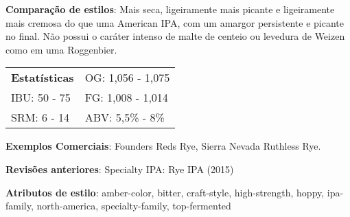 \textbf{Comparação de estilos}: Mais seca, ligeiramente mais picante e ligeiramente mais cremosa do que uma American IPA, com um amargor persistente e picante no final. Não possui o caráter intenso de malte de centeio ou levedura de Weizen como em uma Roggenbier.

\begin{tabular}{@{}p{35mm}p{35mm}@{}}
  \textbf{Estatísticas} & OG: 1,056 - 1,075 \\
  IBU: 50 - 75  & FG: 1,008 - 1,014 \\
  SRM: 6 - 14  & ABV: 5,5\% - 8\%
\end{tabular}

\textbf{Exemplos Comerciais}: Founders Reds Rye, Sierra Nevada Ruthless Rye.

\textbf{Revisões anteriores}: Specialty IPA: Rye IPA (2015)

\textbf{Atributos de estilo}: amber-color, bitter, craft-style, high-strength, hoppy, ipa-family, north-america, specialty-family, top-fermented
